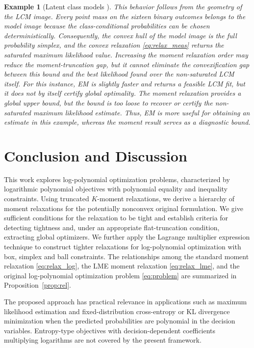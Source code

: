 \documentclass[pdflatex,sn-mathphys-num]{sn-jnl}%
\newcommand{\rd}[1]{{\color{red}#1}}
\theoremstyle{thmstyleone}%
\theoremstyle{thmstyletwo}%
\newtheorem{example}{Example}%
\theoremstyle{thmstylethree}%
\begin{document}
\begin{example}[Latent class models \cite{ChenLCM20}]
{This behavior follows from the geometry of the LCM image. Every point
mass on the sixteen binary outcomes belongs to the model image because
the class-conditional probabilities can be chosen deterministically.
Consequently, the convex hull of the model image is the full
probability simplex, and the convex relaxation \eqref{eq:relax_meas}
returns the saturated maximum likelihood value. Increasing the moment
relaxation order may reduce the moment-truncation gap, but it cannot
eliminate the convexification gap between this bound and the best
likelihood found over the non-saturated LCM itself.
For this instance, EM is slightly faster and returns a feasible LCM
fit, but it does not by itself certify global optimality. The moment
relaxation provides a global upper bound, but the bound is too loose to
recover or certify the non-saturated maximum likelihood estimate.
Thus, EM is more useful for obtaining an estimate in this example,
whereas the moment result serves as a diagnostic bound.
}
    
\end{example}


\section{Conclusion and Discussion}\label{sec:con}

This work explores log-polynomial optimization problems, 
characterized by logarithmic polynomial objectives with 
polynomial equality and inequality constraints. 
Using truncated $K$-moment relaxations,
we derive a hierarchy of moment relaxations
for the potentially nonconvex original formulation.
\rd{We give sufficient conditions for the relaxation to be tight and
establish criteria for detecting tightness and, under an appropriate
flat-truncation condition, extracting global optimizers.}
We further apply the Lagrange multiplier expression technique
to construct tighter relaxations 
for log-polynomial optimization with box, simplex and
ball constraints. 
\rd{The relationships among the standard moment relaxation
\eqref{eq:relax_log}, the LME moment relaxation
\eqref{eq:relax_lme}, and the original log-polynomial optimization
problem \eqref{eq:problem} are summarized in
Proposition~\ref{prop:rel}.}

The proposed approach has practical relevance in applications 
such as maximum likelihood estimation and
fixed-distribution cross-entropy or KL divergence minimization
when the predicted probabilities are polynomial in the decision variables.
Entropy-type objectives with decision-dependent coefficients
multiplying logarithms are not covered by the present framework.
\end{document}

